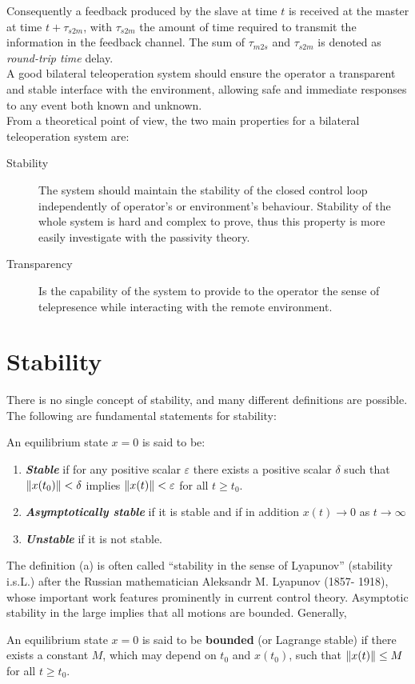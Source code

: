 Consequently a feedback produced by the slave at time $t$ is received at the master at time $t+ \tau_{s2m}$, with $\tau_{s2m}$ the amount of time required to transmit the information in the feedback channel. The sum of  $\tau_{m2s}$ and $\tau_{s2m}$ is denoted as \textit{round-trip time} delay.\\
A good bilateral teleoperation system should ensure the operator a transparent and stable interface with the environment, allowing safe and immediate responses to any event both known and unknown.\\
From a theoretical point of view, the two main properties for a bilateral teleoperation system are:
\begin{description}
	\item[Stability] The system should maintain the stability of the closed control loop independently of operator's or environment's behaviour. Stability of the whole system is hard and complex to prove, thus this property is more easily investigate with the passivity theory.
	\item[Transparency] Is the capability of the system to provide to the operator the sense of telepresence while interacting with the remote environment. 
\end{description}

\section{Stability}
There is no single concept of stability, and many different definitions are possible.
The following are fundamental statements for stability:
\begin{definition}
	An equilibrium state $x=0$ is said to be:
	\begin{enumerate}[label=(\alph*)]
		\item \emph{\textbf{Stable}} if for any positive scalar $\varepsilon$ there exists a positive scalar $\delta$ such that $\left\lVert x(t_{0})\right\rVert < \delta$ implies $\left\lVert x(t)\right\rVert < \varepsilon$ for all $t \geq t_{0}$.
		\item \emph{\textbf{Asymptotically stable}} if it is stable and if in addition $x(t) \rightarrow 0$ as $t \rightarrow \infty$
		\item \emph{\textbf{Unstable}} if it is not stable.
	\end{enumerate}
\end{definition}
The definition (a) is often called “stability in the sense of Lyapunov” (stability i.s.L.) after the Russian mathematician Aleksandr M. Lyapunov (1857- 1918), whose important work features prominently in current control theory.
Asymptotic stability in the large implies that all motions are bounded.
Generally,
\begin{definition}
	An equilibrium state $x=0$ is said to be \textbf{bounded} (or Lagrange stable) if there exists a constant $M$, which may depend on $t_{0}$ and $x(t_{0})$, such that $\left\lVert x(t)\right\rVert \leq M$ for all $t \geq t_{0}$.
\end{definition}


